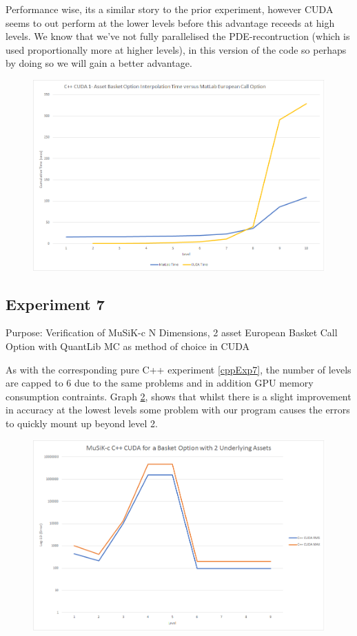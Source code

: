 \documentclass[a4paper]{amsart}
\begin{document}
Performance wise, its a similar story to the prior experiment, however CUDA seems to out perform at the lower levels before this advantage receeds at high levels. We know that we've not fully parallelised the PDE-recontruction (which is used proportionally more at higher levels), in this version of the code so perhaps by doing so we will gain a better advantage.

\begin{figure}[h]
\centering
\includegraphics[scale=0.3]{cuExp5-time.png}
\caption {}
\label {fig:cuExp5t}
\end{figure}

\subsection{Experiment 7}\label{cuExp7}

Purpose: Verification of MuSiK-c N Dimensions, 2 asset European Basket Call Option with QuantLib MC as method of choice in CUDA

As with the corresponding pure C++ experiment \ref{cppExp7}, the number of levels are capped to 6 due to the same problems and in addition GPU memory consumption contraints. Graph \ref{fig:cuExp7e}, shows that whilst there is a slight improvement in accuracy at the lowest levels some problem with our program causes the errors to quickly mount up beyond level 2.

\begin{figure}[h]
\centering
\includegraphics[scale=0.3]{cuExp7-errors.png}
\caption {}
\label {fig:cuExp7e}
\end{figure}
\end{document}
